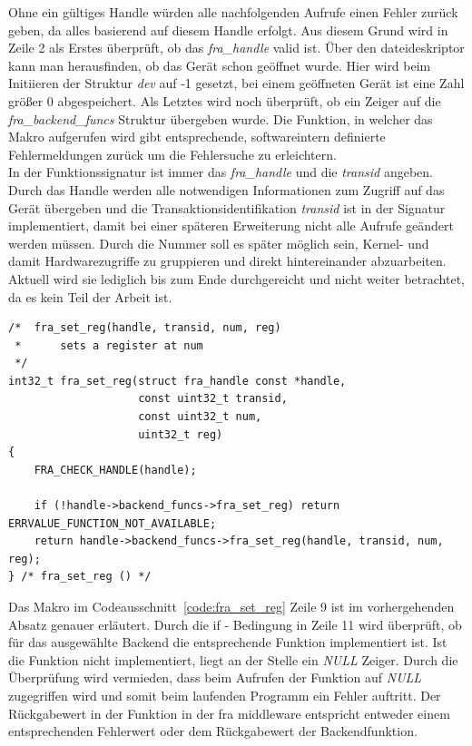 Ohne ein gültiges Handle würden alle nachfolgenden Aufrufe einen Fehler zurück geben, da alles basierend auf diesem Handle erfolgt. Aus diesem Grund wird in Zeile 2 als Erstes überprüft, ob das \textit{fra\_handle} valid ist. Über den \gls{dateideskriptor} kann man herausfinden, ob das Gerät schon geöffnet wurde. Hier wird beim Initiieren der Struktur \textit{dev} auf -1 gesetzt, bei einem geöffneten Gerät ist eine Zahl größer 0 abgespeichert. Als Letztes wird noch überprüft, ob ein Zeiger auf die \textit{fra\_backend\_funcs} Struktur übergeben wurde. Die Funktion, in welcher das Makro aufgerufen wird gibt entsprechende, softwareintern definierte Fehlermeldungen zurück um die Fehlersuche zu erleichtern.\\

In der Funktionssignatur ist immer das \textit{fra\_handle} und die \textit{transid} angeben. Durch das Handle werden alle notwendigen Informationen zum Zugriff auf das Gerät übergeben und die Transaktionsidentifikation \textit{transid} ist in der Signatur implementiert, damit bei einer späteren Erweiterung nicht alle Aufrufe geändert werden müssen. Durch die Nummer soll es später möglich sein, Kernel- und damit Hardwarezugriffe zu gruppieren und direkt hintereinander abzuarbeiten. Aktuell wird sie lediglich bis zum Ende durchgereicht und nicht weiter betrachtet, da es kein Teil der Arbeit ist. 

\begin{lstfloat}
\begin{lstlisting}
/*  fra_set_reg(handle, transid, num, reg)
 *      sets a register at num
 */
int32_t fra_set_reg(struct fra_handle const *handle,
					const uint32_t transid,
					const uint32_t num, 
					uint32_t reg)
{
	FRA_CHECK_HANDLE(handle);

	if (!handle->backend_funcs->fra_set_reg) return ERRVALUE_FUNCTION_NOT_AVAILABLE;
	return handle->backend_funcs->fra_set_reg(handle, transid, num, reg);
} /* fra_set_reg () */
\end{lstlisting}
\end{lstfloat}

Das Makro im Codeausschnitt~\ref{code:fra_set_reg} Zeile 9 ist im vorhergehenden Absatz genauer erläutert.
Durch die if - Bedingung in Zeile 11 wird überprüft, ob für das ausgewählte Backend die entsprechende Funktion implementiert ist. Ist die Funktion nicht implementiert, liegt an der Stelle ein \textit{NULL} Zeiger. Durch die Überprüfung wird vermieden, dass beim Aufrufen der Funktion auf \textit{NULL} zugegriffen wird und somit beim laufenden Programm ein Fehler auftritt. Der Rückgabewert in der Funktion in der \ac{fra} \gls{middleware} entspricht entweder einem entsprechenden Fehlerwert oder dem Rückgabewert der Backendfunktion. 


